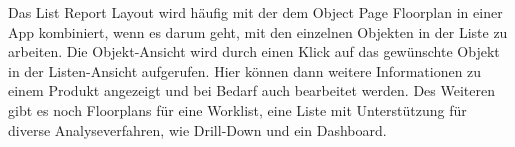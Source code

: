 Das List Report Layout wird häufig mit der dem Object Page Floorplan in einer App kombiniert, wenn es darum geht, mit den einzelnen Objekten in der Liste zu arbeiten. Die Objekt-Ansicht wird durch einen Klick auf das gewünschte Objekt in der Listen-Ansicht aufgerufen. Hier können dann weitere Informationen zu \zB einem Produkt angezeigt und bei Bedarf auch bearbeitet werden. Des Weiteren gibt es noch Floorplans für eine Worklist, eine Liste mit Unterstützung für diverse Analyseverfahren, wie \zB Drill-Down und ein Dashboard.